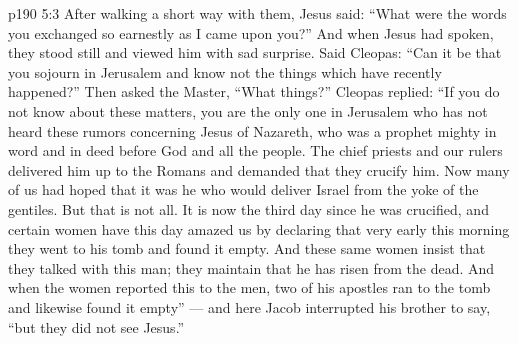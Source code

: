 \vs p190 5:3 After walking a short way with them, Jesus said: \textcolor{ubdarkred}{“What were the words you exchanged so earnestly as I came upon you?”} And when Jesus had spoken, they stood still and viewed him with sad surprise. Said Cleopas: “Can it be that you sojourn in Jerusalem and know not the things which have recently happened?” Then asked the Master, “What things?” Cleopas replied: “If you do not know about these matters, you are the only one in Jerusalem who has not heard these rumors concerning Jesus of Nazareth, who was a prophet mighty in word and in deed before God and all the people. The chief priests and our rulers delivered him up to the Romans and demanded that they crucify him. Now many of us had hoped that it was he who would deliver Israel from the yoke of the gentiles. But that is not all. It is now the third day since he was crucified, and certain women have this day amazed us by declaring that very early this morning they went to his tomb and found it empty. And these same women insist that they talked with this man; they maintain that he has risen from the dead. And when the women reported this to the men, two of his apostles ran to the tomb and likewise found it empty” --- and here Jacob interrupted his brother to say, “but they did not see Jesus.”
